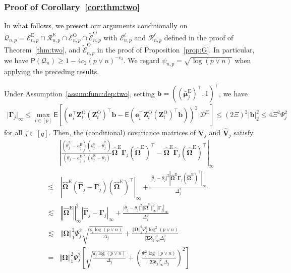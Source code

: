\documentclass[11pt, a4paper]{article}
\newcommand{\mbf}{\mathbf}
\newcommand{\mc}{\mathcal}
\renewcommand{\l}{\left}
\renewcommand{\r}{\right}
\def\wh{\widehat}
\def\wt{\widetilde}
\newcommand{\cp}{\theta}
\newcommand{\E}[0]{\mathsf{E}}
\newcommand{\p}{\mathsf{P}}
\newcommand{\tE}{\text{E}}
\newcommand{\tO}{\text{O}}
\theoremstyle{definition}
\theoremstyle{definition}
\theoremstyle{definition}
\theoremstyle{definition}
\theoremstyle{definition}
\theoremstyle{remark}
\theoremstyle{definition}
\theoremstyle{definition}
\theoremstyle{definition}
\begin{document}
\subsubsection{Proof of Corollary~\ref{cor:thm:two}}

In what follows, we present our arguments conditionally on $\mc Q_{n, p} = \mc E^{\tE}_{n, p} \cap \mc R^{\tE}_{n, p} \cap \mc E^{\tO}_{n, p} \cap \wt{\mc E}^{\tO}_{n, p}$ with $\mc E^\ell_{n, p}$ and $\mc R^\ell_{n, p}$ defined in the proof of Theorem~\ref{thm:two}, and $\wt{\mc E}^{\tO}_{n, p}$ in the proof of Proposition~\ref{prop:G}.
In particular, we have
$\p(\mc Q_n) \ge 1 - 4 c_2 (p \vee n)^{-c_3}$.
We regard $\psi_{n, p} = \sqrt{\log(p \vee n)}$ when applying the preceding results.

Under Assumption~\ref{assum:func:dep:two}, setting $\mbf b = ((\bar{\bm\mu}^{\tE}_j)^\top, 1)^\top$, we have
\begin{align*}
\vert \bm\Gamma_j \vert_\infty \le \max_{i \in [p]} \E\l[ \l( \mbf e_i^\top \mbf Z^{\tO}_t (\mbf Z^{\tO}_t)^\top \mbf b - \E\l( \mbf e_i^\top \mbf Z^{\tO}_t (\mbf Z^{\tO}_t)^\top \mbf b \r) \r)^2  \Big\vert \mc D^{\tE}\r]
\le (2 \Xi)^2 \vert \mbf b \vert_2^2 \le 4 \Xi^2 \Psi_j^2
\end{align*}
for all $j \in [q]$. Then, the (conditional) covariance matrices of $\mbf V_j$ and $\wh{\mbf V}_j$ satisfy
\begin{align*}
& \l\vert \frac{(\wh\cp^{\tE}_j - a^{\tE}_j) (b^{\tE}_j - \wh\cp^{\tE}_j)}{(\cp_j - a^{\tE}_j) (b^{\tE}_j - \cp_j)} \wh{\bm\Omega}^{\tE} \bm\Gamma_j (\wh{\bm\Omega}^{\tE})^\top - \wh{\bm\Omega}^{\tE} \wh{\bm\Gamma}_j (\wh{\bm\Omega}^{\tE})^\top \r\vert_\infty 
\\
\lesssim & \, \l\vert \wh{\bm\Omega}^{\tE} \l( \wh{\bm\Gamma}_j - \bm\Gamma_j\r) (\wh{\bm\Omega}^{\tE})^\top \r\vert_\infty 
+ \frac{\vert \wh{\cp}_j - \cp_j \vert^2 \l\vert \wh{\bm\Omega}^{\tE} \bm\Gamma_j (\wh{\bm\Omega}^{\tE})^\top \r\vert_\infty}{\Delta_j^2} 
\\
\lesssim & \, \l\Vert \wh{\bm\Omega}^{\tE} \r\Vert_{\infty}^2 \l\vert \wh{\bm\Gamma}_j - \bm\Gamma_j\r\vert_{\infty} + \frac{\vert \wh{\cp}_j - \cp_j \vert^2 \Vert \wh{\bm\Omega}^{\tE} \Vert_{\infty}^2 \l\vert \bm\Gamma_j\r\vert_{\infty}}{\Delta_j^2}
\\
\lesssim & \, \Vert \bm\Omega \Vert_1^2 \Psi_j^2 \sqrt{\frac{ \mathfrak{s}_j \log(p \vee n) }{\Delta_j}} + \frac{ \Vert \bm\Omega \Vert_1^2 \Psi_j^6 \log^2(p \vee n)}{ \vert \bm\Sigma \bm\delta_j \vert_\infty^4 \Delta_j^2} 
\\
= & \Vert \bm\Omega \Vert_1^2 \Psi_j^2 \l[ \sqrt{\frac{\mathfrak{s}_j \log(p \vee n)}{\Delta_j}} + \l(\frac{\Psi_j^2 \log(p \vee n)}{\vert \bm\Sigma \bm\delta_j \vert_\infty^2 \Delta_j} \r)^2 \r]
\end{align*}
\end{document}
